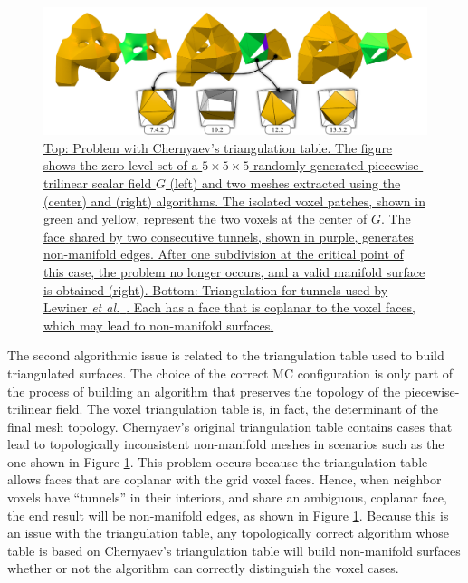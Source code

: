 \begin{figure}[b]
     \centering
     \includegraphics[width=0.9\linewidth]{chapter4/figures/non_manifold.png}
     \caption{\href{http://liscustodio.github.io/C_MC33/figure8.html}{Top: Problem with Chernyaev's triangulation table. The figure shows the  zero level-set of a $5\times5\times5$ randomly generated piecewise-trilinear scalar field $G$ (left) and two meshes extracted using the \mc{} (center) and \cmc{} (right) algorithms. The isolated voxel patches, shown in green and yellow, represent the two voxels at the center of $G$. The face shared by two consecutive tunnels, shown in purple, generates non-manifold edges. After one subdivision at the critical point of this case, the problem no longer occurs, and a valid manifold surface is obtained (right). Bottom: Triangulation for tunnels used by Lewiner \emph{et al.}~\cite{Lewiner:2003}. Each has a face that is coplanar to the voxel faces, which may lead to non-manifold surfaces\cite{lisOnline2013}.}}
  \label{fig:non_manifold}
\end{figure}

The second algorithmic issue is related to the triangulation table used to build triangulated surfaces.
%
The choice of the correct MC configuration is only part of the process of building an algorithm that preserves the topology of the piecewise-trilinear field. The voxel triangulation table is, in fact, the determinant of the final mesh topology.  Chernyaev's original triangulation table contains cases that lead to topologically inconsistent non-manifold meshes in scenarios such as the one shown in Figure \ref{fig:non_manifold}. 
%
This problem occurs because the \mc{} triangulation table allows faces that are coplanar with the grid voxel faces. Hence, when neighbor voxels have ``tunnels'' in their interiors, and share an ambiguous, coplanar face, the end result will be non-manifold edges, as shown in Figure \ref{fig:non_manifold}.
%
Because this is an issue with the triangulation table, any topologically correct algorithm whose table is based on Chernyaev's triangulation table will build non-manifold surfaces whether or not the algorithm can correctly distinguish the voxel cases.

